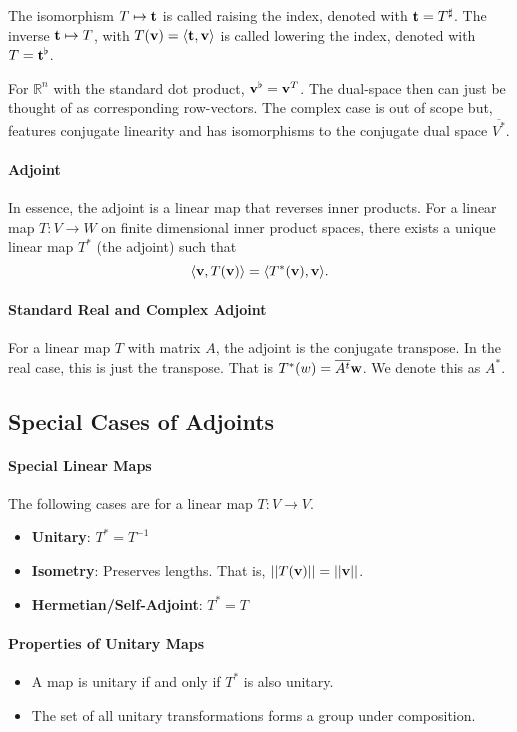 The isomorphism \( T \mapsto \mathbf{t} \) is called raising the index, denoted
with \( \mathbf{t} = T^\sharp \).
The inverse \( \mathbf{t} \mapsto T \), with \( T(\mathbf{v}) = \langle \mathbf{t}, \mathbf{v} \rangle \)
is called lowering the index, denoted with \( T = \mathbf{t}^\flat \).

For \( \mathbb{R}^n \) with the standard dot product, \( \mathbf{v}^\flat = \mathbf{v}^T \).
The dual-space then can just be thought of as corresponding row-vectors.
The complex case is out of scope but, features conjugate linearity and has
isomorphisms to the conjugate dual space \( \overline{V^*} \).

\paragraph{Adjoint}
In essence, the adjoint is a linear map that reverses inner products.
For a linear map \( T: V \to W \) on finite dimensional inner product spaces,
there exists a unique linear map \( T^* \) (the adjoint) such that \[
    \langle \mathbf{v}, T(\mathbf{v}) \rangle = \langle T^*(\mathbf{v}), \mathbf{v} \rangle.
\]

\paragraph{Standard Real and Complex Adjoint}
For a linear map \( T \) with matrix \( A \), the adjoint is the conjugate transpose.
In the real case, this is just the transpose.
That is \( T^*(w) = \overline{A^t} \mathbf{w} \).
We denote this as \( A^* \).

%
%
%
\subsection{Special Cases of Adjoints}

\paragraph{Special Linear Maps}
The following cases are for a linear map \( T: V \to V \).
\begin{itemize}
    \item \textbf{Unitary}: \( T^* = T^{-1} \)
    \item \textbf{Isometry}: Preserves lengths. That is, \( ||T(\mathbf{v})|| = ||\mathbf{v}|| \).
    \item \textbf{Hermetian/Self-Adjoint}: \( T^* = T \)
\end{itemize}

\paragraph{Properties of Unitary Maps}
\begin{itemize}
    \item A map is unitary if and only if \( T^* \) is also unitary.
    \item The set of all unitary transformations forms a group under composition.
\end{itemize}

